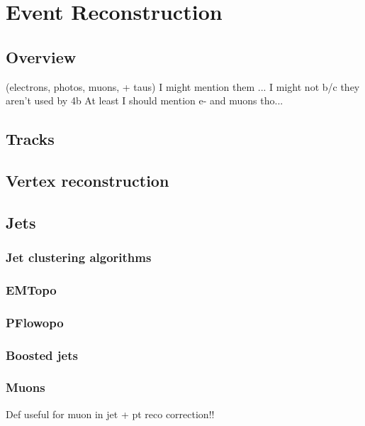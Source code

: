 \chapter{Event Reconstruction}
\label{ch:evtReco}

\section{Overview}
(electrons, photos, muons, + taus)
I might mention them ... I might not b/c they aren't used by 4b
At least I should mention e- and muons tho...

\section{Tracks}

\section{Vertex reconstruction}

\section{Jets}

\subsection{Jet clustering algorithms}

\subsection{EMTopo}

\subsection{PFlowopo}

\subsection{Boosted jets}

\subsection{Muons}
Def useful for muon in jet + pt reco correction!!


